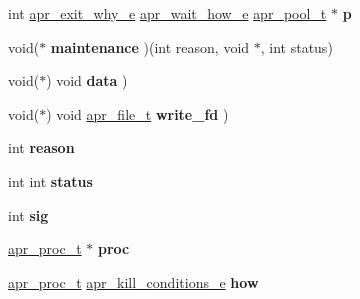 \begin{DoxyCompactItemize}
\item 
\mbox{\label{group__apr__thread__proc_ga0dbc18eca8a209ccd498d893ef54570d}} 
int \mbox{\hyperlink{group__apr__thread__proc_gac097b4fa41e67024711c5983446d0951}{apr\+\_\+exit\+\_\+why\+\_\+e}} \mbox{\hyperlink{group__apr__thread__proc_ga5e52d786644f3b66d6180571e68c7260}{apr\+\_\+wait\+\_\+how\+\_\+e}} \mbox{\hyperlink{group__apr__pools_gaf137f28edcf9a086cd6bc36c20d7cdfb}{apr\+\_\+pool\+\_\+t}} $\ast$ {\bfseries p}
\item 
\mbox{\label{group__apr__thread__proc_gadfff1d91551888e1d2fb62ffac465704}} 
void($\ast$ {\bfseries maintenance} )(int reason, void $\ast$, int status)
\item 
\mbox{\label{group__apr__thread__proc_ga26bde93b34b959be864ebcff43e2b5d6}} 
void($\ast$) void {\bfseries data} )
\item 
\mbox{\label{group__apr__thread__proc_ga2262d56489d6d486af887f01c02fc86e}} 
void($\ast$) void \mbox{\hyperlink{structapr__file__t}{apr\+\_\+file\+\_\+t}} {\bfseries write\+\_\+fd} )
\item 
\mbox{\label{group__apr__thread__proc_gabf19fa5e55c24b9556075afc7b302bbe}} 
int {\bfseries reason}
\item 
\mbox{\label{group__apr__thread__proc_gae7daf19056dc6ab36e8f2e72e911646d}} 
int int {\bfseries status}
\item 
\mbox{\label{group__apr__thread__proc_ga68be1f65e6d1f2949835d9b6b44bcf8e}} 
int {\bfseries sig}
\item 
\mbox{\label{group__apr__thread__proc_ga0872b22b4085e3dafcc7002d15b30010}} 
\mbox{\hyperlink{structapr__proc__t}{apr\+\_\+proc\+\_\+t}} $\ast$ {\bfseries proc}
\item 
\mbox{\label{group__apr__thread__proc_ga6e0837f31f9838d1bc93f4e98184579f}} 
\mbox{\hyperlink{structapr__proc__t}{apr\+\_\+proc\+\_\+t}} \mbox{\hyperlink{group__apr__thread__proc_ga3eaec78633742e7e0cb9480a21477aff}{apr\+\_\+kill\+\_\+conditions\+\_\+e}} {\bfseries how}
\end{DoxyCompactItemize}


